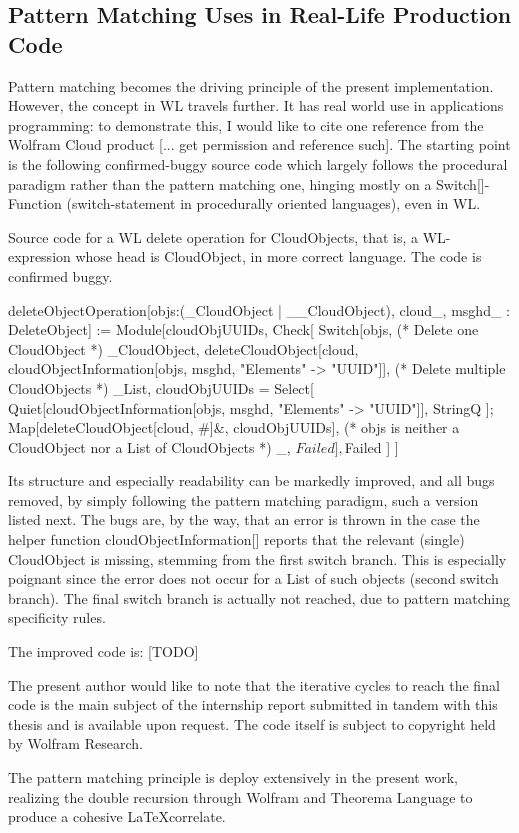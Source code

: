 \subsection{Pattern Matching Uses in Real-Life Production Code}

Pattern matching becomes the driving principle of the present implementation. However, the concept in WL travels further. It has real world use in applications programming: to demonstrate this, I would like to cite one reference from the Wolfram Cloud product [... get permission and reference such]. The starting point is the following confirmed-buggy source code which largely follows the procedural paradigm rather than the pattern matching one, hinging mostly on a Switch[]-Function (switch-statement in procedurally oriented languages), even in WL.

\begin{program}
\caption{Source code for a WL delete operation for CloudObjects, that is, a WL-expression whose head is CloudObject, in more correct language. The code is confirmed buggy.}
\label{deleteObjectOperation}
\begin{LaTeXCode}
deleteObjectOperation[objs:(_CloudObject | {__CloudObject}), cloud_, msghd_ : DeleteObject] :=
    Module[{cloudObjUUIDs},
        Check[
            Switch[objs,
                (* Delete one CloudObject *)
                _CloudObject, deleteCloudObject[cloud, cloudObjectInformation[objs, msghd, "Elements" -> "UUID"]],    
                (* Delete multiple CloudObjects *)
                _List, 
                    cloudObjUUIDs = Select[
                        Quiet[cloudObjectInformation[objs, msghd, "Elements" -> "UUID"]],
                        StringQ
                    ];
                    Map[deleteCloudObject[cloud, #]&, cloudObjUUIDs],
                (* objs is neither a CloudObject nor a List of CloudObjects *)
                _, $Failed
            ],
            $Failed
        ]
    ]
\end{LaTeXCode}
\end{program}

Its structure and especially readability can be markedly improved, and all bugs removed, by simply following the pattern matching paradigm, such a version listed next. The bugs are, by the way, that an error is thrown in the case the helper function cloudObjectInformation[] reports that the relevant (single) CloudObject is missing, stemming from the first switch branch. This is especially poignant since the error does not occur for a List of such objects (second switch branch). The final switch branch is actually not reached, due to pattern matching specificity rules.

The improved code is: [TODO]

The present author would like to note that the iterative cycles to reach the final code is the main subject of the internship report submitted in tandem with this thesis and is available upon request. The code itself is subject to copyright held by Wolfram Research.

The pattern matching principle is deploy extensively in the present work, realizing the double recursion through Wolfram and Theorema Language to produce a cohesive \LaTeX correlate. 
